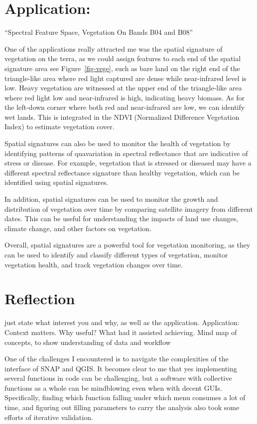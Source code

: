 \documentclass[
  letterpaper,
  DIV=11,
  numbers=noendperiod]{scrreprt}
\begin{document}
\hypertarget{application}{%
\section{Application:}\label{application}}

``Spectral Feature Space, Vegetation On Bands B04 and B08''

One of the applications really attracted me was the spatial signature of
vegetation on the terra, as we could assign features to each end of the
spatial signature area see Figure~\ref{fig-vege}, such as bare land on
the right end of the triangle-like area where red light captured are
dense while near-infrared level is low. Heavy vegetation are witnessed
at the upper end of the triangle-like area where red light low and
near-infrared is high, indicating heavy biomass. As for the left-down
corner where both red and near-infrared are low, we can identify wet
lands. This is integrated in the NDVI (Normalized Difference Vegetation
Index) to estimate vegetation cover.

Spatial signatures can also be used to monitor the health of vegetation
by identifying patterns of quavariation in spectral reflectance that are
indicative of stress or disease. For example, vegetation that is
stressed or diseased may have a different spectral reflectance signature
than healthy vegetation, which can be identified using spatial
signatures.

In addition, spatial signatures can be used to monitor the growth and
distribution of vegetation over time by comparing satellite imagery from
different dates. This can be useful for understanding the impacts of
land use changes, climate change, and other factors on vegetation.

Overall, spatial signatures are a powerful tool for vegetation
monitoring, as they can be used to identify and classify different types
of vegetation, monitor vegetation health, and track vegetation changes
over time.

\hypertarget{reflection}{%
\section{Reflection}\label{reflection}}

just state what interest you and why, as well as the application.
Application: Context matters. Why useful? What had it assisted
achieving. Mind map of concepts, to show understanding of data and
workflow

One of the challenges I encountered is to navigate the complexities of
the interface of SNAP and QGIS. It becomes clear to me that yes
implementing several functions in code can be challenging, but a
software with collective functions as a whole can be mindblowing even
when with decent GUIs. Specifically, finding which function falling
under which menu consumes a lot of time, and figuring out filling
parameters to carry the analysis also took some efforts of iterative
validation.
\end{document}
